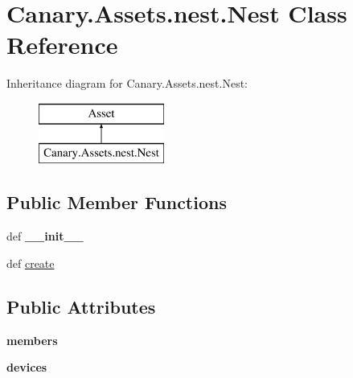 \hypertarget{class_canary_8_assets_1_1nest_1_1_nest}{\section{Canary.\-Assets.\-nest.\-Nest Class Reference}
\label{class_canary_8_assets_1_1nest_1_1_nest}
}
Inheritance diagram for Canary.\-Assets.\-nest.\-Nest\-:\begin{figure}[H]
\begin{center}
\leavevmode
\includegraphics[height=2.000000cm]{class_canary_8_assets_1_1nest_1_1_nest}
\end{center}
\end{figure}
\subsection*{Public Member Functions}
\begin{DoxyCompactItemize}
\item 
\hypertarget{class_canary_8_assets_1_1nest_1_1_nest_a08762fef6a888c091d715ecf0389b94e}{def {\bfseries \-\_\-\-\_\-init\-\_\-\-\_\-}}\label{class_canary_8_assets_1_1nest_1_1_nest_a08762fef6a888c091d715ecf0389b94e}

\item 
def \hyperlink{class_canary_8_assets_1_1nest_1_1_nest_a47512cf180bd7a40dd0c0f54ad4abe34}{create}
\end{DoxyCompactItemize}
\subsection*{Public Attributes}
\begin{DoxyCompactItemize}
\item 
\hypertarget{class_canary_8_assets_1_1nest_1_1_nest_a48e63a5fd53479073fdd2fac9bf89fb7}{{\bfseries members}}\label{class_canary_8_assets_1_1nest_1_1_nest_a48e63a5fd53479073fdd2fac9bf89fb7}

\item 
\hypertarget{class_canary_8_assets_1_1nest_1_1_nest_a0735f70e693bad2e0bb0d77470272fcf}{{\bfseries devices}}\label{class_canary_8_assets_1_1nest_1_1_nest_a0735f70e693bad2e0bb0d77470272fcf}

\end{DoxyCompactItemize}


